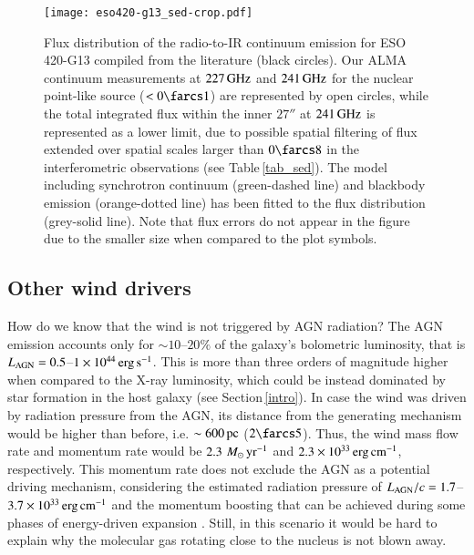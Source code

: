 \documentclass[longauth]{aa}
\newcommand{\msun}{\,\hbox{$M_{\odot}$}}
\begin{document}
\begin{figure}
\centering
\texttt{[image: eso420-g13\_sed-crop.pdf]}
\caption{Flux distribution of the radio-to-IR continuum emission for ESO\,420-G13 compiled from the literature (black circles). Our ALMA continuum measurements at $227\, \rm{GHz}$ and $241\, \rm{GHz}$ for the nuclear point-like source ($< 0\farcs1$) are represented by open circles, while the total integrated flux within the inner $27''$ at $241\, \rm{GHz}$ is represented as a lower limit, due to possible spatial filtering of flux extended over spatial scales larger than $0\farcs8$ in the interferometric observations (see Table\,\ref{tab_sed}). The model including synchrotron continuum (green-dashed line) and blackbody emission (orange-dotted line) has been fitted to the flux distribution (grey-solid line). Note that flux errors do not appear in the figure due to the smaller size when compared to the plot symbols.}\label{fig_sed}
\end{figure}

\subsection{Other wind drivers}
How do we know that the wind is not triggered by AGN radiation? The AGN emission accounts only for $\sim 10$--$20\%$ of the galaxy's bolometric luminosity, that is $L_{\rm AGN} = 0.5$--$1 \times 10^{44}\, \rm{erg\,s^{-1}}$. This is more than three orders of magnitude higher when compared to the X-ray luminosity, which could be instead dominated by star formation in the host galaxy (see Section\,\ref{intro}). In case the wind was driven by radiation pressure from the AGN, its distance from the generating mechanism would be higher than before, i.e. $\sim 600\, \rm{pc}$ ($2\farcs5$). Thus, the wind mass flow rate and momentum rate would be $2.3\, \rm{\msun\,yr^{-1}}$ and $2.3 \times 10^{33}\, \rm{erg\,cm^{-1}}$, respectively. This momentum rate does not exclude the AGN as a potential driving mechanism, considering the estimated radiation pressure of $L_{\rm AGN}/c = 1.7$--$3.7 \times 10^{33}\, \rm{erg\,cm^{-1}}$ and the momentum boosting that can be achieved during some phases of energy-driven expansion . Still, in this scenario it would be hard to explain why the molecular gas rotating close to the nucleus is not blown away.
\end{document}
